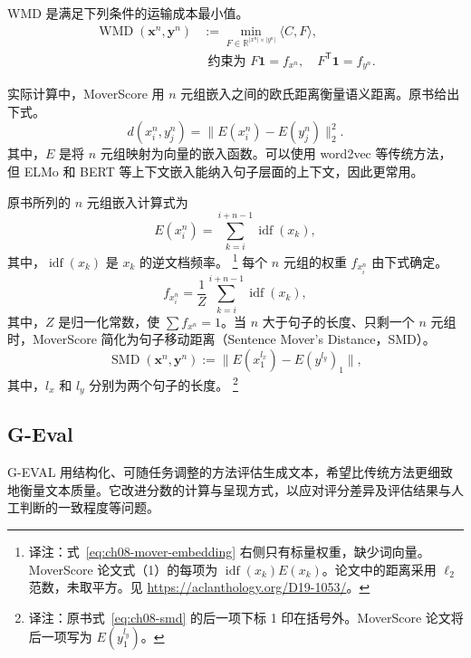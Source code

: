 WMD 是满足下列条件的运输成本最小值。
\begin{equation}
\begin{aligned}
\operatorname{WMD}(\symbf{x}^n,\symbf{y}^n)
&:=\min_{F\in\mathbb{R}^{|x^n|\times|y^n|}}\langle C,F\rangle,\\
&\phantom{:}\text{约束为 }F\symbf{1}=f_{x^n},\quad F^{\mathsf T}\symbf{1}=f_{y^n}.
\end{aligned}
\label{eq:ch08-wmd}
\end{equation}

实际计算中，MoverScore 用 $n$ 元组嵌入之间的欧氏距离衡量语义距离。原书给出下式。
\begin{equation}
d(x_i^n,y_j^n)=\lVert E(x_i^n)-E(y_j^n)\rVert_2^2.
\label{eq:ch08-mover-distance}
\end{equation}
其中，$E$ 是将 $n$ 元组映射为向量的嵌入函数。可以使用 word2vec 等传统方法，但 ELMo 和 BERT 等上下文嵌入能纳入句子层面的上下文，因此更常用。

原书所列的 $n$ 元组嵌入计算式为
\begin{equation}
E(x_i^n)=\sum_{k=i}^{i+n-1}\operatorname{idf}(x_k),
\label{eq:ch08-mover-embedding}
\end{equation}
其中，$\operatorname{idf}(x_k)$ 是 $x_k$ 的逆文档频率。%
\footnote{译注：式~\eqref{eq:ch08-mover-embedding} 右侧只有标量权重，缺少词向量。MoverScore 论文式（1）的每项为 $\operatorname{idf}(x_k)E(x_k)$。论文中的距离采用 $\ell_2$ 范数，未取平方。见 \url{https://aclanthology.org/D19-1053/}。}
每个 $n$ 元组的权重 $f_{x_i^n}$ 由下式确定。
\begin{equation}
f_{x_i^n}=\frac{1}{Z}\sum_{k=i}^{i+n-1}\operatorname{idf}(x_k),
\label{eq:ch08-mover-weight}
\end{equation}
其中，$Z$ 是归一化常数，使 $\sum f_{x^n}=1$。当 $n$ 大于句子的长度、只剩一个 $n$ 元组时，MoverScore 简化为句子移动距离（Sentence Mover's Distance，SMD）。
\begin{equation}
\operatorname{SMD}(\symbf{x}^n,\symbf{y}^n)
:=\lVert E(x_1^{l_x})-E(y^{l_y})_1\rVert,
\label{eq:ch08-smd}
\end{equation}
其中，$l_x$ 和 $l_y$ 分别为两个句子的长度。%
\footnote{译注：原书式~\eqref{eq:ch08-smd} 的后一项下标 1 印在括号外。MoverScore 论文将后一项写为 $E(y_1^{l_y})$。}

\subsection{G-Eval}
G-EVAL 用结构化、可随任务调整的方法评估生成文本，希望比传统方法更细致地衡量文本质量。它改进分数的计算与呈现方式，以应对评分差异及评估结果与人工判断的一致程度等问题。

